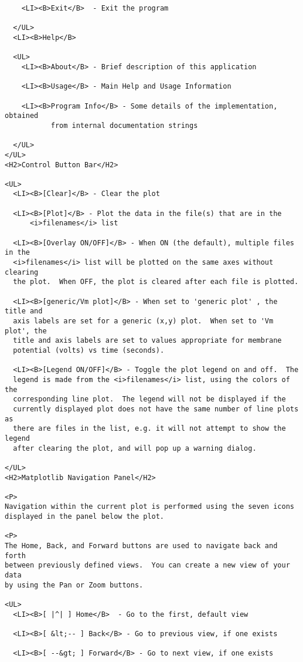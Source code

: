 \documentclass[12pt]{article}
\begin{document}
\begin{verbatim}
    <LI><B>Exit</B>  - Exit the program

  </UL>
  <LI><B>Help</B>

  <UL>
    <LI><B>About</B> - Brief description of this application

    <LI><B>Usage</B> - Main Help and Usage Information

    <LI><B>Program Info</B> - Some details of the implementation, obtained
           from internal documentation strings

  </UL>
</UL>
<H2>Control Button Bar</H2>

<UL>
  <LI><B>[Clear]</B> - Clear the plot

  <LI><B>[Plot]</B> - Plot the data in the file(s) that are in the
      <i>filenames</i> list

  <LI><B>[Overlay ON/OFF]</B> - When ON (the default), multiple files in the
  <i>filenames</i> list will be plotted on the same axes without clearing
  the plot.  When OFF, the plot is cleared after each file is plotted.

  <LI><B>[generic/Vm plot]</B> - When set to 'generic plot' , the title and
  axis labels are set for a generic (x,y) plot.  When set to 'Vm plot', the
  title and axis labels are set to values appropriate for membrane
  potential (volts) vs time (seconds).

  <LI><B>[Legend ON/OFF]</B> - Toggle the plot legend on and off.  The
  legend is made from the <i>filenames</i> list, using the colors of the
  corresponding line plot.  The legend will not be displayed if the
  currently displayed plot does not have the same number of line plots as
  there are files in the list, e.g. it will not attempt to show the legend
  after clearing the plot, and will pop up a warning dialog.

</UL>
<H2>Matplotlib Navigation Panel</H2>

<P>
Navigation within the current plot is performed using the seven icons
displayed in the panel below the plot.

<P>
The Home, Back, and Forward buttons are used to navigate back and forth
between previously defined views.  You can create a new view of your data
by using the Pan or Zoom buttons.

<UL>
  <LI><B>[ |^| ] Home</B>  - Go to the first, default view

  <LI><B>[ &lt;-- ] Back</B> - Go to previous view, if one exists

  <LI><B>[ --&gt; ] Forward</B> - Go to next view, if one exists


\end{verbatim}
\end{document}
